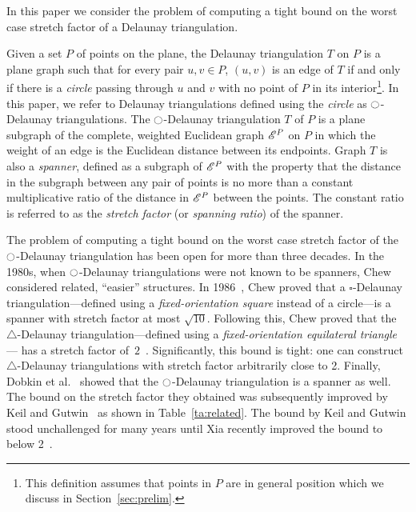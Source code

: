 In this paper we consider the problem of computing a tight bound
on the worst case stretch factor of a Delaunay triangulation. 

Given a set $P$ of points on the plane, the Delaunay triangulation $T$ on $P$
is a plane graph such that for every pair $u,v \in P$, $(u,v)$ is an edge of
$T$ if and only if there is a {\em circle} passing through $u$ and $v$ with no
point of $P$ in its interior\footnote{This definition assumes that points in
$P$ are in general position which we discuss in Section~\ref{sec:prelim}.}. 
In this paper, we refer to Delaunay triangulations defined using the
{\em circle} as
$\ocircle$-Delaunay triangulations. The $\ocircle$-Delaunay triangulation 
$T$ of $P$ is a plane subgraph of the complete, weighted Euclidean graph
$\mathscr{E}^P$ on $P$ in which the weight of an edge is the Euclidean distance between
its endpoints. Graph $T$ is also a {\em spanner}, defined as a subgraph of
$\mathscr{E}^P$ with
the property that the distance in the subgraph between any pair of points is
no more than a constant multiplicative ratio of the distance in $\mathscr{E}^P$ between
the points. The constant ratio is referred to as the {\em stretch factor} (or
{\em spanning ratio}) of the spanner.

The problem of computing a tight bound on the worst case stretch factor of the
$\ocircle$-Delaunay triangulation has been open for more than three decades. 
In the 1980s, when $\ocircle$-Delaunay triangulations were not known to be
spanners, Chew considered related, ``easier'' structures. In
1986~\cite{Chew86}, Chew proved that a $\square$-Delaunay
triangulation---defined using a {\em fixed-orientation square}
instead of a circle---is a 
spanner with stretch factor at most $\sqrt{10}$. Following this, Chew
proved that the $\triangle$-Delaunay
triangulation---defined using a
{\em fixed-orientation equilateral triangle}
--- has a stretch factor of~$2$~\cite{Chew89}. Significantly, this bound is
tight: one can construct $\triangle$-Delaunay
triangulations with stretch factor arbitrarily close to 2.
Finally, Dobkin et al.~\cite{DFS90} showed that the $\ocircle$-Delaunay
triangulation is a spanner as well. The bound on the stretch factor they obtained was
subsequently improved by Keil and Gutwin~\cite{KG92} as shown in
Table~\ref{ta:related}.
The bound by Keil and Gutwin stood unchallenged
for many years until Xia recently improved the bound to below
2~\cite{Xia13}.


